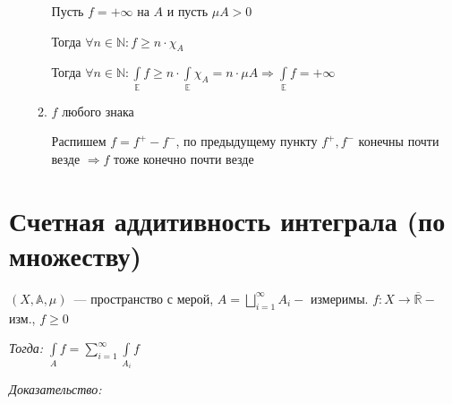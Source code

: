 \documentclass[paper=a4, fontsize=13.2pt]{article}
\begin{document}
\begin{enumerate}
\begin{enumerate}
		Пусть $f = +\infty$ на $A$ и пусть $\mu A > 0$

		Тогда $\forall n \in \mathds{N}: f \geqslant n \cdot \chi_A$

		Тогда $\forall n \in \mathds{N}: \int\limits_{\mathds{E}} f \geqslant n \cdot \int\limits_{\mathds{E}} \chi_A = n \cdot \mu A \Rightarrow \int\limits_{\mathds{E}} f = + \infty$

		\item $f$ любого знака

		Распишем $f = f^+ - f^-$, по предыдущему пункту $f^+, f^-$ конечны почти везде $\Rightarrow f$ тоже конечно почти везде
	\end{enumerate}

\end{enumerate}

\section{Счетная аддитивность интеграла (по множеству)}
$(X,\mathds{A},\mu)$~--- пространство с мерой, $A = \bigsqcup\limits_{i=1}^{\infty}A_{i} -$ измеримы. $f: X \rightarrow \mathbb{\overline{R}} - $ изм., $f \geqslant 0$

\emph{Тогда:} ${\displaystyle \int\limits_{A}f = \sum\limits_{i=1}^{\infty} \int\limits_{A_{i}}f}$

\emph{Доказательство:}
\end{document}
